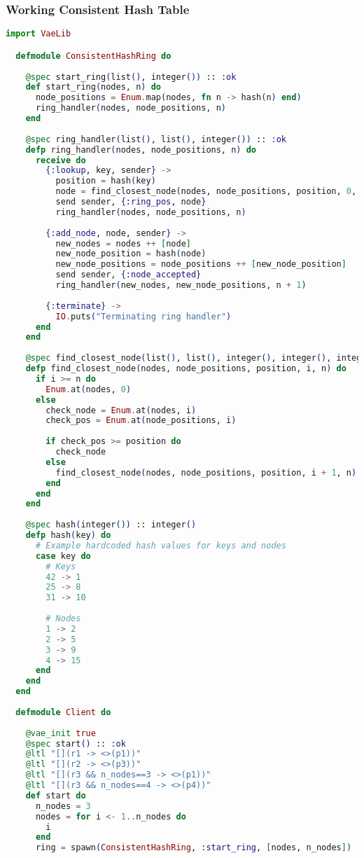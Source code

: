 \subsubsection{Working Consistent Hash Table}
\begin{lstlisting}[language=Elixir, xleftmargin=.1\linewidth]
  import VaeLib

  defmodule ConsistentHashRing do
  
    @spec start_ring(list(), integer()) :: :ok
    def start_ring(nodes, n) do
      node_positions = Enum.map(nodes, fn n -> hash(n) end)
      ring_handler(nodes, node_positions, n)
    end
  
    @spec ring_handler(list(), list(), integer()) :: :ok
    defp ring_handler(nodes, node_positions, n) do
      receive do
        {:lookup, key, sender} ->
          position = hash(key)
          node = find_closest_node(nodes, node_positions, position, 0, n)
          send sender, {:ring_pos, node}
          ring_handler(nodes, node_positions, n)
  
        {:add_node, node, sender} ->
          new_nodes = nodes ++ [node]
          new_node_position = hash(node)
          new_node_positions = node_positions ++ [new_node_position]
          send sender, {:node_accepted}
          ring_handler(new_nodes, new_node_positions, n + 1)
  
        {:terminate} ->
          IO.puts("Terminating ring handler")
      end
    end
  
    @spec find_closest_node(list(), list(), integer(), integer(), integer()) :: integer()
    defp find_closest_node(nodes, node_positions, position, i, n) do
      if i >= n do
        Enum.at(nodes, 0)
      else
        check_node = Enum.at(nodes, i)
        check_pos = Enum.at(node_positions, i)
  
        if check_pos >= position do
          check_node
        else
          find_closest_node(nodes, node_positions, position, i + 1, n)
        end
      end
    end
  
    @spec hash(integer()) :: integer()
    defp hash(key) do
      # Example hardcoded hash values for keys and nodes
      case key do
        # Keys
        42 -> 1
        25 -> 8
        31 -> 10
  
        # Nodes
        1 -> 2
        2 -> 5
        3 -> 9
        4 -> 15
      end
    end
  end
  
  defmodule Client do
  
    @vae_init true
    @spec start() :: :ok
    @ltl "[](r1 -> <>(p1))"
    @ltl "[](r2 -> <>(p3))"
    @ltl "[](r3 && n_nodes==3 -> <>(p1))"
    @ltl "[](r3 && n_nodes==4 -> <>(p4))"
    def start do
      n_nodes = 3
      nodes = for i <- 1..n_nodes do
        i
      end
      ring = spawn(ConsistentHashRing, :start_ring, [nodes, n_nodes])
  

\end{lstlisting}
